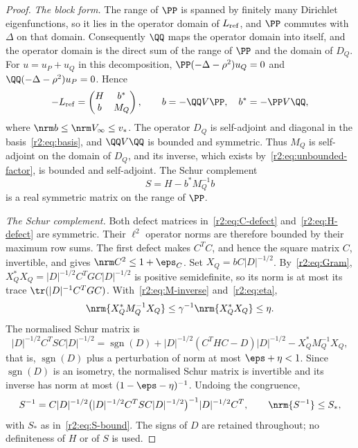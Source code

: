 \begin{proof}
\emph{The block form.}
The range of $\PP$ is spanned by finitely many Dirichlet eigenfunctions, so it lies in the operator domain of $L_{\rm ref}$, and $\PP$ commutes with $\Delta$ on that domain. Consequently $\QQ$ maps the operator domain into itself, and the operator domain is the direct sum of the range of $\PP$ and the domain of $D_Q$. For $u=u_P+u_Q$ in this decomposition, $\PP(-\Delta-\rho^2)u_Q=0$ and $\QQ(-\Delta-\rho^2)u_P=0$. Hence
\[
 -L_{\rm ref}=\begin{pmatrix}H&b^*\\b&M_Q\end{pmatrix},
 \qquad b=-\QQ V\PP,\quad b^*=-\PP V\QQ,
\]
where $\nrm b\le\nrm V_\infty\le v_*$. The operator $D_Q$ is self-adjoint and diagonal in the basis~\eqref{r2:eq:basis}, and $\QQ V\QQ$ is bounded and symmetric. Thus $M_Q$ is self-adjoint on the domain of $D_Q$, and its inverse, which exists by~\eqref{r2:eq:unbounded-factor}, is bounded and self-adjoint. The Schur complement
\[
 S=H-b^*M_Q^{-1}b
\]
is a real symmetric matrix on the range of $\PP$.

\emph{The Schur complement.}
Both defect matrices in~\eqref{r2:eq:C-defect} and~\eqref{r2:eq:H-defect} are symmetric. Their $\ell^2$ operator norms are therefore bounded by their maximum row sums. The first defect makes $C^TC$, and hence the square matrix $C$, invertible, and gives $\nrm C^2\le1+\eps_C$. Set $X_Q=bC|D|^{-1/2}$. By~\eqref{r2:eq:Gram}, $X_Q^*X_Q=|D|^{-1/2}C^TGC|D|^{-1/2}$ is positive semidefinite, so its norm is at most its trace $\tr(|D|^{-1}C^TGC)$. With~\eqref{r2:eq:M-inverse} and~\eqref{r2:eq:eta},
\[
 \nrm{X_Q^*M_Q^{-1}X_Q}
 \le\gamma^{-1}\nrm{X_Q^*X_Q}
 \le\eta.
\]
The normalised Schur matrix is
\[
 |D|^{-1/2}C^TSC|D|^{-1/2}
 =\operatorname{sgn}(D)
 +|D|^{-1/2}(C^THC-D)|D|^{-1/2}-X_Q^*M_Q^{-1}X_Q,
\]
that is, $\operatorname{sgn}(D)$ plus a perturbation of norm at most $\eps+\eta<1$. Since $\operatorname{sgn}(D)$ is an isometry, the normalised Schur matrix is invertible and its inverse has norm at most $(1-\eps-\eta)^{-1}$. Undoing the congruence,
\[
 S^{-1}=C|D|^{-1/2}\bigl(|D|^{-1/2}C^TSC|D|^{-1/2}\bigr)^{-1}|D|^{-1/2}C^T,
 \qquad\nrm{S^{-1}}\le S_*,
\]
with $S_*$ as in~\eqref{r2:eq:S-bound}. The signs of $D$ are retained throughout; no definiteness of $H$ or of $S$ is used.


\end{proof}
